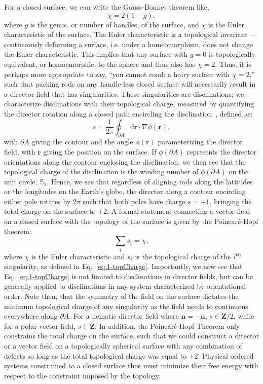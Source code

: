 For a closed surface, we can write the Gauss-Bonnet theorem like,
\begin{equation}
  \chi = 2(1-g),\label{e:1-GB1}
\end{equation}
where $g$ is the genus, or number of handles, of the surface, and $\chi$ is the Euler characteristic of the surface.
The Euler characteristic is a topological invariant --- continuously deforming a surface, i.e. under a homeomorphism, does not change the Euler characteristic.
This implies that any surface with $g=0$ is topologically equivalent, or homoemorphic, to the sphere and thus also has $\chi=2$.
Thus, it is perhaps more appropriate to say, ``you cannot comb a hairy surface with $\chi=2$,'' such that packing rods on any handle-less closed surface will necessarily result in a director field that has singularities.
These singularities are disclinations; we characterize disclinations with their topological charge, measured by quantifying the director rotation along a closed path encircling the disclination~\cite{RN23,RN153,RN203}, defined as:
\begin{equation}
  s = \frac{1}{2 \pi}\oint_{\partial A} \textrm{d}\mathbf{r} \cdot \nabla\phi(\mathbf{r}),\label{eq:1-topCharge}
\end{equation}
with $\partial A$ giving the contour and the angle $\phi(\mathbf{r})$ parameterizing the director field, with $\mathbf{r}$ giving the position on the surface.
If $\phi(\partial A)$ represents the director orientations along the contour enclosing the disclination, we then see that the topological charge of the disclination is the winding number of $\phi(\partial A)$ on the unit circle, $\mathbb{S}_1$.
Hence, we see that regardless of aligning rods along the latitudes or the longitudes on the Earth's globe, the director along a contour encircling either pole rotates by $2 \pi$ such that both poles have charge $s = +1$, bringing the total charge on the surface to $+2$.
A formal statement connecting a vector field on a closed surface with the topology of the surface is given by the Poincar\'e-Hopf theorem:
\begin{equation}
  \sum\limits_i s_i = \chi,\label{e:1-PH}
\end{equation}
where $\chi$ is the Euler characteristic and $s_i$ is the topological charge of the $i^{\rm th}$ singularity, as defined in Eq.~\ref{eq:1-topCharge}.
Importantly, we now see that Eq.~\ref{eq:1-topCharge} is not limited to disclinations in director fields, but can be generally applied to disclinations in any system characterized by orientational order.
Note then, that the symmetry of the field on the surface dictates the minimum topological charge of any singularity as the field needs to continuous everywhere along $\partial A$.
For a nematic director field where $\mathbf{n} = -\mathbf{n}$, $s \in \mathbf{Z}/2$, while for a polar vector field, $s \in \mathbf{Z}$.
In addition, the Poincar\'e-Hopf Theorem only constrains the total charge on the surface, such that we could construct a director or a vector field on a topologically spherical surface with any combination of defects so long as the total topological charge was equal to $+2$.
Physical ordered systems constrained to a closed surface thus must minimize their free energy with respect to the constraint imposed by the topology.

